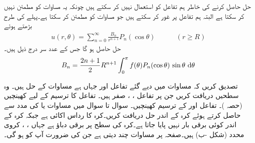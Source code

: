  حل حاصل کرنے کی خاطر ہم تفاعل  کو استعمال نہیں کر سکتے ہیں چونکہ یہ مساوات  کو مطمئن نہیں کر سکتا ہے البتہ ہم تفاعل  پر غور کر سکتے ہیں جو مساوات  کو مطمئن کر سکتا ہے۔پہلے کی طرح بڑھتے ہوئے
\begin{align}
u(r,\theta)=\sum_{n=0}^{\infty} \frac{B_n}{r^{n+1}}P_n(\cos\theta)\quad \quad \quad (r\ge R)
\end{align}
حل حاصل ہو گا جس کے عدد سر درج ذیل ہیں۔
\begin{align}
B_n=\frac{2n+1}{2}R^{n+1}\int_0^{\pi} f(\theta)P_n(\cos \theta)\,\sin\theta\,\dif \theta
\end{align}


\quad
تصدیق کریں کہ مساوات  میں دیے گئے تفاعل  اور  جہاں  ہے مساوات  کے حل ہیں۔ 
\quad
وہ سطحیں دریافت کریں جن پر تفاعل ، ،  صفر ہیں۔
\quad
تفاعل  کا ترسیم  کے لیے کھینچیں (حصہ )۔
\quad
تفاعل  اور  کے ترسیم کھینچیں۔
سوال  تا سوال  میں مساوات  یا  کی مدد سے   حاصل کرتے ہوئے کرہ کے اندر حل  دریافت کریں۔کرہ کا رداس اکائی  ہے جبکہ کرہ کے اندر کوئی برقی بار نہیں پایا جاتا ہے۔کرہ کی سطح پر برقی دباؤ  ہے جہاں ، ،  کروی محدد (شکل -ب) ہیں۔صفحہ  پر مساوات   چند  دیتی ہے جن کی ضرورت آپ کو ہو گی۔ 


